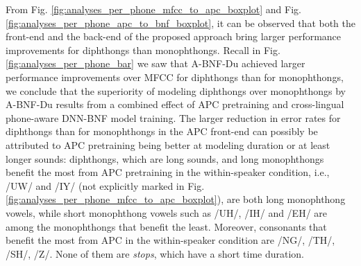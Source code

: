 \documentclass[transmag]{IEEEtran}
\begin{document}
From Fig. \ref{fig:analyses_per_phone_mfcc_to_apc_boxplot} and Fig.  \ref{fig:analyses_per_phone_apc_to_bnf_boxplot}, 
it can be observed that both the front-end and the back-end of the proposed approach bring larger performance improvements for diphthongs than monophthongs. Recall in Fig. \ref{fig:analyses_per_phone_bar} we saw that A-BNF-Du  achieved larger performance improvements over MFCC for diphthongs than for monophthongs, we conclude that the superiority of modeling diphthongs over monophthongs by A-BNF-Du results from a combined effect of APC pretraining and cross-lingual phone-aware DNN-BNF model training. The larger reduction in error rates  for diphthongs than for monophthongs in the APC front-end can possibly be attributed to APC pretraining being better at modeling duration or at least longer sounds: diphthongs, which are long sounds, and long monophthongs benefit the most from APC pretraining in the within-speaker condition, i.e., /UW/ and /IY/ (not explicitly marked in Fig. \ref{fig:analyses_per_phone_mfcc_to_apc_boxplot}), are both long monophthong vowels, while short monophthong vowels such as /UH/, /IH/ and /EH/ are among the monophthongs that benefit the least. Moreover, consonants that benefit the most from APC in the within-speaker condition are /NG/, /TH/, /SH/, /Z/. None of them are \textit{stops}, which have a short time duration.




\end{document}
